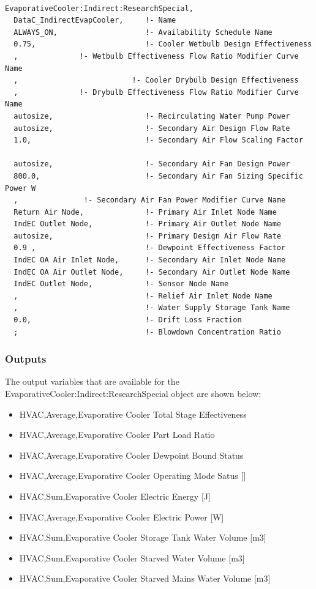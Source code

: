 \begin{lstlisting}

EvaporativeCooler:Indirect:ResearchSpecial,
  DataC_IndirectEvapCooler,     !- Name
  ALWAYS_ON,                    !- Availability Schedule Name
  0.75,                         !- Cooler Wetbulb Design Effectiveness
  ,              !- Wetbulb Effectiveness Flow Ratio Modifier Curve Name
  ,                          !- Cooler Drybulb Design Effectiveness
  ,              !- Drybulb Effectiveness Flow Ratio Modifier Curve Name
  autosize,                     !- Recirculating Water Pump Power
  autosize,                     !- Secondary Air Design Flow Rate
  1.0,                          !- Secondary Air Flow Scaling Factor

  autosize,                     !- Secondary Air Fan Design Power
  800.0,                        !- Secondary Air Fan Sizing Specific Power W
  ,               !- Secondary Air Fan Power Modifier Curve Name
  Return Air Node,              !- Primary Air Inlet Node Name
  IndEC Outlet Node,            !- Primary Air Outlet Node Name
  autosize,                     !- Primary Design Air Flow Rate
  0.9 ,                         !- Dewpoint Effectiveness Factor
  IndEC OA Air Inlet Node,      !- Secondary Air Inlet Node Name
  IndEC OA Air Outlet Node,     !- Secondary Air Outlet Node Name
  IndEC Outlet Node,            !- Sensor Node Name
  ,                             !- Relief Air Inlet Node Name
  ,                             !- Water Supply Storage Tank Name
  0.0,                          !- Drift Loss Fraction
  ;                             !- Blowdown Concentration Ratio
\end{lstlisting}

\subsubsection{Outputs}\label{outputs-4-004}

The output variables that are available for the EvaporativeCooler:Indirect:ResearchSpecial object are shown below:

\begin{itemize}
\item
  HVAC,Average,Evaporative Cooler Total Stage Effectiveness
\item
  HVAC,Average,Evaporative Cooler Part Load Ratio
\item
  HVAC,Average,Evaporative Cooler Dewpoint Bound Status
\item
  HVAC,Average,Evaporative Cooler Operating Mode Satus {[]}
\item
  HVAC,Sum,Evaporative Cooler Electric Energy {[}J{]}
\item
  HVAC,Average,Evaporative Cooler Electric Power {[}W{]}
\item
  HVAC,Sum,Evaporative Cooler Storage Tank Water Volume {[}m3{]}
\item
  HVAC,Sum,Evaporative Cooler Starved Water Volume {[}m3{]}
\item
  HVAC,Sum,Evaporative Cooler Starved Mains Water Volume {[}m3{]}
\end{itemize}

